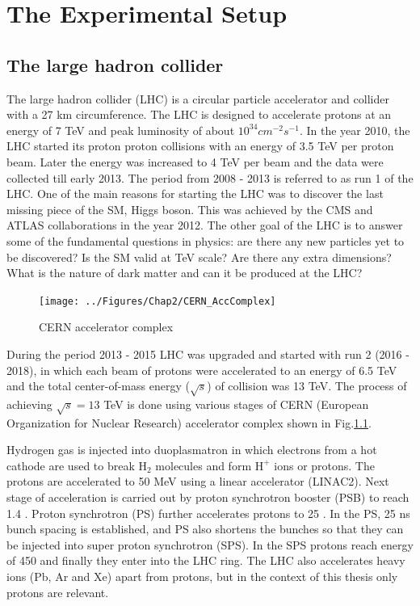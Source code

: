 \chapter{The Experimental Setup}
\label{Chap2}

\section{The large hadron collider}
The large hadron collider (LHC) is a circular particle accelerator and collider with a 27 km circumference. The LHC is designed to 
accelerate protons at an energy of 7 TeV \cite{Bruning:782076} and peak luminosity of about $10^{34}cm^{-2}s^{-1}$.
In the year 2010, the LHC started its proton proton collisions with an energy of 3.5 TeV per proton beam. Later the energy was increased
to 4 TeV per beam and the data were collected till early 2013. The period from 2008 - 2013 is referred to as run 1 of the LHC. 
One of the main reasons for starting the LHC was to discover the last missing piece of the SM, Higgs boson. This was
achieved by the CMS and ATLAS collaborations \cite{Aad:2012tfa}\cite{Chatrchyan:2012xdj} in the year 2012. The other goal of
the LHC is to answer some of the fundamental questions in physics: are there any new particles yet to be discovered?
Is the SM valid at TeV scale? Are there any extra dimensions? What is the nature of dark matter and can it be produced at the LHC?
\begin{figure}[h!]
\centering
\texttt{[image: ../Figures/Chap2/CERN\_AccComplex]}
\caption[CERN accelerator complex]{CERN accelerator complex}
\label{fig:CERN_AccComplex}
\end{figure}
During the period 2013 - 2015 LHC was upgraded and started with run 2 (2016 - 2018), in which each beam of protons were accelerated to 
an energy of 6.5 TeV and the total center-of-mass energy ($\sqrt{s}$) of collision was 13 TeV. The process of achieving $\sqrt{s} = 13$ 
TeV is done using various stages of CERN (European Organization for Nuclear Research) accelerator complex \cite{Haffner:1621894} shown in 
Fig.\ref{fig:CERN_AccComplex}.

Hydrogen gas is injected into duoplasmatron in which electrons from a hot cathode are used to break $\mathrm{H_2}$ molecules and form 
$\mathrm{H^+}$ ions or protons. The protons are accelerated to 50 MeV using a 
linear accelerator (LINAC2). Next stage of acceleration is carried out by proton synchrotron booster (PSB) to reach 1.4 \gev. Proton 
synchrotron (PS) further accelerates protons to 25 \gev. In the PS, 25 ns bunch spacing is established, and PS also shortens the bunches
so that they can be injected into super proton synchrotron (SPS). In the SPS protons reach energy 
of 450 \gev and finally they enter into the LHC ring. The LHC also accelerates heavy ions (Pb, Ar and Xe) apart from protons, but in the 
context of this thesis only protons are relevant.

